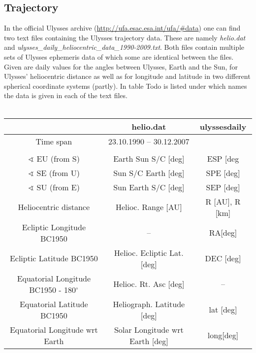 \documentclass[]{article}
\begin{document}
	\subsection{Trajectory}
	In the official Ulysses archive (\url{http://ufa.esac.esa.int/ufa/#data}) one can find two text files containing the Ulysses trajectory data. These are namely \textit{helio.dat} and \textit{ulysses\_daily\_heliocentric\_data\_1990-2009.txt}. Both files contain multiple sets of Ulysses ephemeris data of which some are identical between the files. Given are daily values for the angles between Ulysses, Earth and the Sun, for Ulysses' heliocentric distance as well as for longitude and latitude in two different spherical coordinate systems (partly). In table Todo is listed under which names the data is given in each of the text files. \\ \\
	\begin{minipage}{0.9\textwidth}
	\begin{tabular}{|c|c|c|}
	\hline 
	& helio.dat & ulyssesdaily \\ 
	\hline 
	Time span &  23.10.1990 \footnotemark -- 30.12.2007  &  \\ 
	\hline 
	&  &  \\ 
	\hline 
	$\sphericalangle$ EU (from S)\footnotemark & Earth Sun S/C [deg] & ESP [deg \\ 
	\hline 
	$\sphericalangle$ SE (from U)\footnotemark & Sun S/C Earth [deg] & SPE [deg] \\ 
	\hline 
	$\sphericalangle$ SU (from E)\footnotemark & Sun Earth S/C [deg] & SEP [deg] \\ 
	\hline 
	Heliocentric distance & Helioc. Range [AU] & R [AU], R [km] \\ 
	\hline 
	Ecliptic Longitude BC1950 & -- & RA[deg] \\ 
	\hline 
	Ecliptic Latitude BC1950 & Helioc. Ecliptic Lat. [deg] & DEC [deg] \\ 
	\hline 
	Equatorial Longitude BC1950 - 180$^\circ$ & Helioc. Rt. Asc [deg] &  -- \\ 
	\hline 
	Equatorial Latitude BC1950 & Heliograph. Latitude [deg] & lat [deg] \\ 
	\hline 
	Equatorial Longitude wrt Earth & Solar Longitude wrt Earth [deg] & long[deg] \\  
	\hline 
\end{tabular}

\end{minipage}
\end{document}
